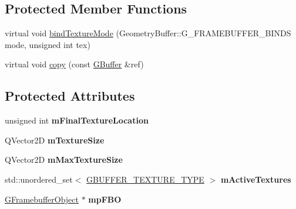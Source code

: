 \subsection*{Protected Member Functions}
\begin{DoxyCompactItemize}
\item 
virtual void \mbox{\hyperlink{class_geometry_engine_1_1_geometry_buffer_1_1_g_buffer_a0aec7c721a63bfbb7b50882e4a34a861}{bind\+Texture\+Mode}} (Geometry\+Buffer\+::\+G\+\_\+\+F\+R\+A\+M\+E\+B\+U\+F\+F\+E\+R\+\_\+\+B\+I\+N\+DS mode, unsigned int tex)
\item 
virtual void \mbox{\hyperlink{class_geometry_engine_1_1_geometry_buffer_1_1_g_buffer_a9f20eb78703ef048d59a54f90ee09f25}{copy}} (const \mbox{\hyperlink{class_geometry_engine_1_1_geometry_buffer_1_1_g_buffer}{G\+Buffer}} \&ref)
\end{DoxyCompactItemize}
\subsection*{Protected Attributes}
\begin{DoxyCompactItemize}
\item 
\mbox{\label{class_geometry_engine_1_1_geometry_buffer_1_1_g_buffer_a6fc8627c8538eb232c21f0f23e0375d1}} 
unsigned int {\bfseries m\+Final\+Texture\+Location}
\item 
\mbox{\label{class_geometry_engine_1_1_geometry_buffer_1_1_g_buffer_a14ab02ce110b16e44ade0d2cec0a1bfe}} 
Q\+Vector2D {\bfseries m\+Texture\+Size}
\item 
\mbox{\label{class_geometry_engine_1_1_geometry_buffer_1_1_g_buffer_a5dab69ea8f4510c241ccda6817b4af32}} 
Q\+Vector2D {\bfseries m\+Max\+Texture\+Size}
\item 
\mbox{\label{class_geometry_engine_1_1_geometry_buffer_1_1_g_buffer_ad9b17162f29ea4d0600d665bd3f7f0e3}} 
std\+::unordered\+\_\+set$<$ \mbox{\hyperlink{class_geometry_engine_1_1_geometry_buffer_1_1_g_buffer_a718dceafcac1915f7de061108597e1cc}{G\+B\+U\+F\+F\+E\+R\+\_\+\+T\+E\+X\+T\+U\+R\+E\+\_\+\+T\+Y\+PE}} $>$ {\bfseries m\+Active\+Textures}
\item 
\mbox{\label{class_geometry_engine_1_1_geometry_buffer_1_1_g_buffer_adecb16016bf50ab1f50924cee963f432}} 
\mbox{\hyperlink{class_geometry_engine_1_1_geometry_buffer_1_1_g_framebuffer_object}{G\+Framebuffer\+Object}} $\ast$ {\bfseries mp\+F\+BO}
\end{DoxyCompactItemize}
